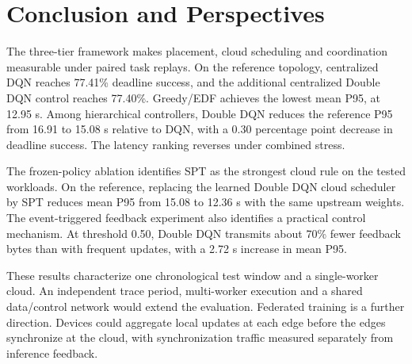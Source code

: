 \section{Conclusion and Perspectives}
The three-tier framework makes placement, cloud scheduling and coordination
measurable under paired task replays. On the reference topology,
centralized DQN reaches 77.41\% deadline success, and the additional
centralized Double DQN control reaches 77.40\%. Greedy/EDF achieves
the lowest mean P95, at 12.95 s. Among hierarchical controllers,
Double DQN reduces the reference P95 from 16.91 to 15.08 s relative
to DQN, with a 0.30 percentage point decrease in deadline success.
The latency ranking reverses under combined stress.

The frozen-policy ablation identifies SPT as the strongest cloud rule
on the tested workloads. On the reference, replacing the learned
Double DQN cloud scheduler by SPT reduces mean P95 from 15.08 to
12.36 s with the same upstream weights. The event-triggered feedback
experiment also identifies a practical control mechanism. At
threshold 0.50, Double DQN transmits about 70\% fewer feedback bytes
than with frequent updates, with a 2.72 s increase in mean P95.

These results characterize one chronological test window and a
single-worker cloud. An independent trace period, multi-worker
execution and a shared data/control network would extend the
evaluation. Federated training is a further direction. Devices could
aggregate local updates at each edge before the edges synchronize at
the cloud, with synchronization traffic measured separately from
inference feedback.
